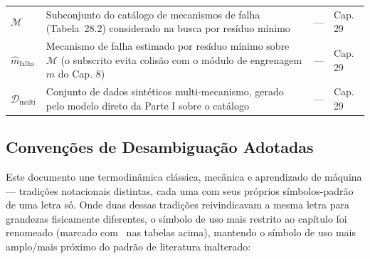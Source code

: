\documentclass[12pt,a4paper]{article}
\numberwithin{equation}{section}
\numberwithin{table}{section}
\numberwithin{figure}{section}
\begin{document}
{\begin{longtable}{>{\raggedright\arraybackslash}p{2.8cm} >{\raggedright\arraybackslash}p{5.3cm} >{\raggedright\arraybackslash}p{2.1cm} >{\raggedright\arraybackslash}p{4.2cm}}
	$\mathcal{M}$ & Subconjunto do catálogo de mecanismos de falha (Tabela~28.2) considerado na busca por resíduo mínimo & --- & Cap. 29 \\
	$\hat{m}_{\text{falha}}$\dag & Mecanismo de falha estimado por resíduo mínimo sobre $\mathcal{M}$ (o subscrito evita colisão com o módulo de engrenagem $m$ do Cap. 8) & --- & Cap. 29 \\
	$\mathcal{D}_{\text{multi}}$ & Conjunto de dados sintéticos multi-mecanismo, gerado pelo modelo direto da Parte I sobre o catálogo & --- & Cap. 29 \\ \bottomrule
\end{longtable}
}

\subsection*{Convenções de Desambiguação Adotadas}
Este documento une termodinâmica clássica, mecânica e aprendizado de máquina — tradições notacionais distintas, cada uma com seus próprios símbolos-padrão de uma letra só. Onde duas dessas tradições reivindicavam a mesma letra para grandezas fisicamente diferentes, o símbolo de uso mais restrito ao capítulo foi renomeado (marcado com \dag\ nas tabelas acima), mantendo o símbolo de uso mais amplo/mais próximo do padrão de literatura inalterado:
\end{document}
